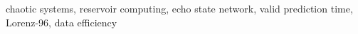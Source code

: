 chaotic systems, reservoir computing, echo state network, valid prediction time, Lorenz-96, data efficiency
